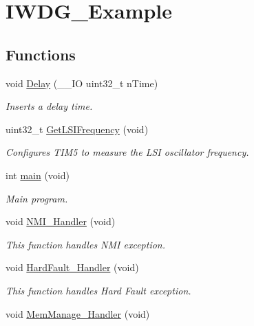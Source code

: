 \hypertarget{group___i_w_d_g___example}{\section{I\-W\-D\-G\-\_\-\-Example}
\label{group___i_w_d_g___example}
}
\subsection*{Functions}
\begin{DoxyCompactItemize}
\item 
void \hyperlink{group___i_w_d_g___example_gadf6ebc82af142bc201d3eb70e107f52e}{Delay} (\-\_\-\-\_\-\-I\-O uint32\-\_\-t n\-Time)
\begin{DoxyCompactList}\small\item\em Inserts a delay time. \end{DoxyCompactList}\item 
uint32\-\_\-t \hyperlink{group___i_w_d_g___example_ga1a38870e915c07db0f748a86318f805b}{Get\-L\-S\-I\-Frequency} (void)
\begin{DoxyCompactList}\small\item\em Configures T\-I\-M5 to measure the L\-S\-I oscillator frequency. \end{DoxyCompactList}\item 
int \hyperlink{group___i_w_d_g___example_ga840291bc02cba5474a4cb46a9b9566fe}{main} (void)
\begin{DoxyCompactList}\small\item\em Main program. \end{DoxyCompactList}\item 
void \hyperlink{group___i_w_d_g___example_ga6ad7a5e3ee69cb6db6a6b9111ba898bc}{N\-M\-I\-\_\-\-Handler} (void)
\begin{DoxyCompactList}\small\item\em This function handles N\-M\-I exception. \end{DoxyCompactList}\item 
void \hyperlink{group___i_w_d_g___example_ga2bffc10d5bd4106753b7c30e86903bea}{Hard\-Fault\-\_\-\-Handler} (void)
\begin{DoxyCompactList}\small\item\em This function handles Hard Fault exception. \end{DoxyCompactList}\item 
void \hyperlink{group___i_w_d_g___example_ga3150f74512510287a942624aa9b44cc5}{Mem\-Manage\-\_\-\-Handler} (void)

\end{DoxyCompactItemize}

